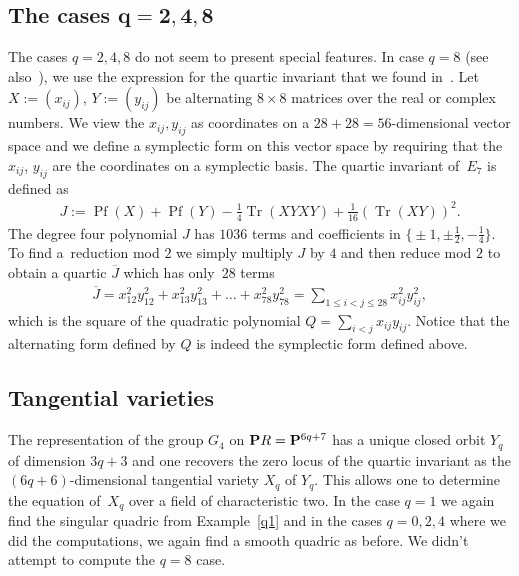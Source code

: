 \documentclass[10pt,a4paper]{amsart}
\newcommand{\PP}{{\bf P}}
\numberwithin{equation}{section}
\begin{document}
\subsection[The cases $q=2,4,8$]{The cases $\boldsymbol{q=2,4,8}$}\label{q8}
The cases $q=2,4,8$ do not seem to present special features. In case $q=8$ (see also~\cite{wilson}), we use the expression for the quartic invariant that we found in~\cite{freudenthal}. Let $X:=(x_{ij})$, $Y:=(y_{ij})$ be alternating $8\times 8$ matrices over the real or complex numbers. We view the $x_{ij},y_{ij}$ as coordinates on a $28+28=56$-dimensional vector space and we define a symplectic form on this vector space by requiring that the $x_{ij}$, $y_{ij}$ are the coordinates on a symplectic basis. The quartic invariant of~$E_7$ is defined as
\begin{gather*}
J := \operatorname{Pf}(X) + \operatorname{Pf}(Y) - \tfrac{1}{4} \operatorname{Tr}(XYXY) + \tfrac{1}{16} (\operatorname{Tr}(XY))^2.
\end{gather*}
The degree four polynomial $J$ has $1036$ terms and coefficients in $\big\{{\pm}1, \pm \frac{1}{2}, - \frac{1}{4} \big\}$. To find a~reduction mod $2$ we simply multiply $J$ by $4$ and then reduce mod $2$ to obtain a quartic $\overline{J}$ which has only~$28$ terms
\begin{gather*}
\overline{J} = x_{12}^2y_{12}^2 + x_{13}^2y_{13}^2 + \dots + x_{78}^2y_{78}^2 = \sum_{1\leq i<j\leq 28} x_{ij}^2y_{ij}^2,
\end{gather*}
which is the square of the quadratic polynomial $Q=\sum\limits_{i<j} x_{ij}y_{ij}$. Notice that the alternating form defined by $Q$ is indeed the symplectic form defined above.

\subsection{Tangential varieties}\label{tgv}
The representation of the group $G_4$ on $\PP R=\PP^{6q+7}$ has a unique closed orbit $Y_q$ of dimension $3q+3$ and one recovers the zero locus of the quartic invariant
as the $(6q+6)$-dimensional tangential variety $X_q$ of $Y_q$. This allows one to determine the equation of~$X_q$ over a field of characteristic two. In the case $q=1$ we again find the singular quadric from Example~\ref{q1} and in the cases $q=0,2,4$ where we did the computations, we again find a smooth quadric as before. We didn't attempt to compute the $q=8$ case.
\end{document}
